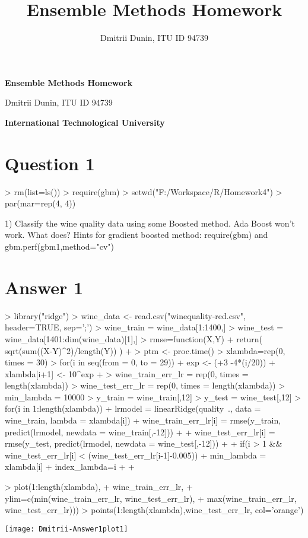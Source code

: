 \documentclass{article}
\title{Ensemble Methods Homework}
\author{Dmitrii Dunin, ITU ID 94739}
\begin{document}

\begin{center}
{\bf\Large Ensemble Methods Homework}
\end{center}
\begin{center}
{\Large Dmitrii Dunin, ITU ID 94739}
\end{center}
\begin{center}
{\bf\Large International Technological University}
\end{center}

\section*{Question 1}

\begin{Schunk}
\begin{Sinput}
> rm(list=ls())
> require(gbm)
> setwd("F:/Workspace/R/Homework4")
> par(mar=rep(4, 4))
\end{Sinput}
\end{Schunk}

1) Classify the wine quality data using some Boosted method. Ada Boost
won't work. What does? Hints for gradient boosted method: require(gbm)
and gbm.perf(gbm1,method="cv")

\section*{Answer  1}
\begin{Schunk}
\begin{Sinput}
> library("ridge")
> wine_data <- read.csv("winequality-red.csv", header=TRUE, sep=';')
> wine_train = wine_data[1:1400,]
> wine_test = wine_data[1401:dim(wine_data)[1],]
> rmse=function(X,Y){
+   return( sqrt(sum((X-Y)^2)/length(Y)) )
+ }
> ptm <- proc.time()
> xlambda=rep(0, times = 30)
> for(i in seq(from = 0, to = 29)){
+ exp <- (+3 -4*(i/20))
+ xlambda[i+1] <- 10^exp
+ }
> wine_train_err_lr = rep(0, times = length(xlambda))
> wine_test_err_lr = rep(0, times = length(xlambda))
> min_lambda = 10000
> y_train = wine_train[,12]
> y_test = wine_test[,12]
> for(i in 1:length(xlambda)){
+ lrmodel = linearRidge(quality~., data = wine_train, lambda = xlambda[i])
+ wine_train_err_lr[i] = rmse(y_train, predict(lrmodel, newdata = wine_train[,-12]))
+ 
+ wine_test_err_lr[i] = rmse(y_test, predict(lrmodel, newdata = wine_test[,-12]))
+ 
+ if(i > 1 && wine_test_err_lr[i] < (wine_test_err_lr[i-1]-0.005)){
+ min_lambda = xlambda[i]
+ index_lambda=i
+   }
+ }
\end{Sinput}
\end{Schunk}
\begin{Schunk}
\begin{Sinput}
> plot(1:length(xlambda),
+      wine_train_err_lr,
+      ylim=c(min(wine_train_err_lr, wine_test_err_lr),
+             max(wine_train_err_lr, wine_test_err_lr)))
> points(1:length(xlambda),wine_test_err_lr, col='orange')
\end{Sinput}
\end{Schunk}
\texttt{[image: Dmitrii-Answer1plot1]}
\end{document}
